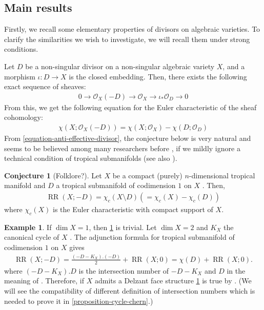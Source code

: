 \documentclass[a4paper,dvipdfmx,reqno,12pt]{amsart}
\theoremstyle{definition}
\newtheorem{example}[theorem]{Example}
\newtheorem{conjecture}[theorem]{Conjecture}
\newcommand{\opn}[1]{\operatorname{#1}}
\numberwithin{equation}{section}
\begin{document}
\subsection{Main results}

Firstly, we recall some elementary properties
of divisors on algebraic varieties. 
To clarify the similarities we wish to investigate,
we will recall them under strong conditions.

Let $D$ be a non-singular divisor on a non-singular
algebraic variety $X$, and a morphism  
$\iota\colon D\to X$ is the closed embedding.
Then, there exists the following exact sequence
of sheaves:
\begin{align}
     0\to \mathcal{O}_X(-D)\to 
\mathcal{O}_X\to \iota_*\mathcal{O}_D\to 0
\end{align}
From this, we get the following equation for the Euler
characteristic of the sheaf cohomology:
\begin{align}
\label{equation-anti-effective-divisor}
\chi(X;\mathcal{O}_X(-D))=\chi(X;\mathcal{O}_X)
-\chi(D;\mathcal{O}_D)
\end{align}
From \eqref{equation-anti-effective-divisor},
the conjecture below is very natural and 
seems to be believed among many researchers
before \cite{demedrano2023chern}, if
we mildly ignore a technical condition of 
tropical submanifolds \cite{demedrano2023chern} (see also
\cite[Definition 4.3]{shaw2015tropical}).

\begin{conjecture}[{Folklore?}]
\label{conjecture-rr-c-euler}
Let $X$ be a compact
(purely) $n$-dimensional tropical manifold and
$D$ a tropical submanifold of codimension $1$
on $X$ 
\cite[Definition 2.14]{demedrano2023chern}.
Then,
\begin{align}
\opn{RR}(X;-D)=
\chi_c (X\setminus D) (=\chi_c (X)-\chi_c(D))
\end{align}
where $\chi_c(X)$ is the Euler characteristic
with compact support of $X$.
\end{conjecture}

\begin{example}
If $\dim X=1$, then 
\cref{conjecture-rr-c-euler} is trivial.
Let $\dim X=2$ and $K_X$ the canonical cycle of
$X$ \cite[Definition 5.8]{MR2275625}.
The adjunction formula for tropical submanifold
of codimension $1$ on $X$
\cite[Theorem 6]{shaw2015tropical} gives
\begin{align}
\opn{RR}(X;-D)=\frac{(-D-K_X).(-D)}{2}+\opn{RR}(X;0)
=\chi(D)+\opn{RR}(X;0).
\end{align}
where $(-D-K_X).D$ is the intersection number of 
$-D-K_X$ and $D$ in the meaning of \cite{shaw2015tropical}.
Therefore, if $X$ admits a Delzant face structure 
\cref{conjecture-rr-c-euler} is true
by \cite[Theorem 6.3]{demedrano2023chern}.
(We will see the compatibility of different definition of
intersection numbers which is needed to prove it in
\cref{proposition-cycle-chern}.)
\end{example}
\end{document}
